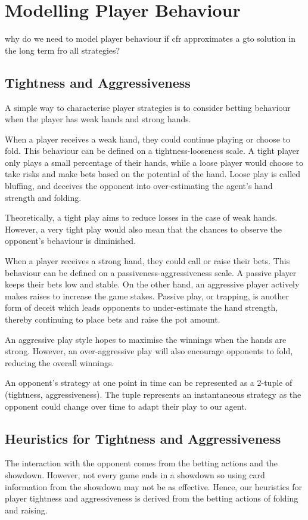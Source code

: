 \documentclass{article}
\begin{document}
\section{Modelling Player Behaviour}
why do we need to model player behaviour if cfr approximates a gto solution in the long term fro all strategies? 

\subsection{Tightness and Aggressiveness}
A simple way to characterise player strategies is to consider betting behaviour when the player has weak hands and strong hands. 

When a player receives a weak hand, they could continue playing or choose to fold. This behaviour can be defined on a tightness-looseness scale. A tight player only plays a small percentage of their hands, while a loose player would choose to take risks and make bets based on the potential of the hand. Loose play is called bluffing, and deceives the opponent into over-estimating the agent's hand strength and folding.

Theoretically, a tight play aims to reduce losses in the case of weak hands. However, a very tight play would also mean that the chances to observe the opponent's behaviour is diminished.

When a player receives a strong hand, they could call or raise their bets. This behaviour can be defined on a passiveness-aggressiveness scale. A passive player keeps their bets low and stable. On the other hand, an aggressive player actively makes raises to increase the game stakes. Passive play, or trapping, is another form of deceit which leads opponents to under-estimate the hand strength, thereby continuing to place bets and raise the pot amount.

An aggressive play style hopes to maximise the winnings when the hands are strong. However, an over-aggressive play will also encourage opponents to fold, reducing the overall winnings.

An opponent's strategy at one point in time can be represented as a 2-tuple of (tightness, aggressiveness). The tuple represents an instantaneous strategy as the opponent could change over time to adapt their play to our agent.

\subsection{Heuristics for Tightness and Aggressiveness}
The interaction with the opponent comes from the betting actions and the showdown. However, not every game ends in a showdown so using card information from the showdown may not be as effective. Hence, our heuristics for player tightness and aggressiveness is derived from the betting actions of folding and raising.
\end{document}
